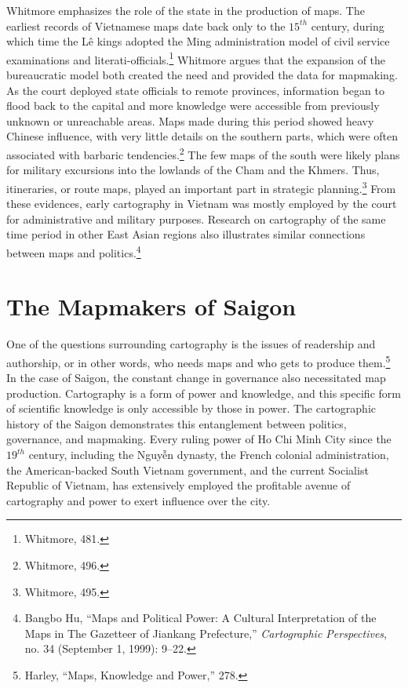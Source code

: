 Whitmore emphasizes the role of the state in the production of maps. The earliest records of Vietnamese maps date back only to the $15^{th}$ century, during which time the Lê kings adopted the Ming administration model of civil service examinations and literati-officials.\footnote{Whitmore, 481.} Whitmore argues that the expansion of the bureaucratic model both created the need and provided the data for mapmaking. As the court deployed state officials to remote provinces, information began to flood back to the capital and more knowledge were accessible from previously unknown or unreachable areas. Maps made during this period showed heavy Chinese influence, with very little details on the southern parts, which were often associated with barbaric tendencies.\footnote{Whitmore, 496.} The few maps of the south were likely plans for military excursions into the lowlands of the Cham and the Khmers. Thus, itineraries, or route maps, played an important part in strategic planning.\footnote{Whitmore, 495.} From these evidences, early cartography in Vietnam was mostly employed by the court for administrative and military purposes. Research on cartography of the same time period in other East Asian regions also illustrates similar connections between maps and politics.\footnote{Bangbo Hu, “Maps and Political Power: A Cultural Interpretation of the Maps in The Gazetteer of Jiankang Prefecture,” \textit{Cartographic Perspectives}, no. 34 (September 1, 1999): 9–22.}

\section{The Mapmakers of Saigon}\label{sec:mapmakers}
One of the questions surrounding cartography is the issues of readership and authorship, or in other words, who needs maps and who gets to produce them.\footnote{Harley, “Maps, Knowledge and Power,” 278.} In the case of Saigon, the constant change in governance also necessitated map production. Cartography is a form of power and knowledge, and this specific form of scientific knowledge is only accessible by those in power. The cartographic history of the Saigon demonstrates this entanglement between politics, governance, and mapmaking. Every ruling power of Ho Chi Minh City since the $19^{th}$ century, including the Nguyễn dynasty, the French colonial administration, the American-backed South Vietnam government, and the current Socialist Republic of Vietnam, has extensively employed the profitable avenue of cartography and power to exert influence over the city.

